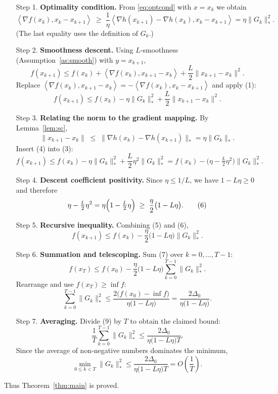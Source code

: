 \documentclass{article}
\newcommand{\inner}[2]{\left\langle #1,#2\right\rangle}
\begin{document}
\begin{enumerate}
\item[Step 1.] \textbf{Optimality condition.}  
From \eqref{eq:optcond} with $x=x_{k}$ we obtain
\[
\inner{\nabla f(x_{k})}{x_{k}-x_{k+1}}
\;\ge\;
\frac{1}{\eta}\inner{\nabla h(x_{k+1})-\nabla h(x_{k})}{x_{k}-x_{k+1}}
= \eta\|G_{k}\|_{*}^{2}.
\tag{1}
\]
(The last equality uses the definition of $G_{k}$.)

\item[Step 2.] \textbf{Smoothness descent.}  
Using $L$‑smoothness (Assumption~\ref{as:smooth}) with $y=x_{k+1}$,
\[
f(x_{k+1})\le f(x_{k})+\inner{\nabla f(x_{k})}{x_{k+1}-x_{k}}
+\frac{L}{2}\|x_{k+1}-x_{k}\|^{2}.
\tag{2}
\]
Replace $\inner{\nabla f(x_{k})}{x_{k+1}-x_{k}}=-\inner{\nabla f(x_{k})}{x_{k}-x_{k+1}}$ and apply (1):
\[
f(x_{k+1})
\le f(x_{k})-\eta\|G_{k}\|_{*}^{2}
+\frac{L}{2}\|x_{k+1}-x_{k}\|^{2}.
\tag{3}
\]

\item[Step 3.] \textbf{Relating the norm to the gradient mapping.}  
By Lemma~\ref{lem:sc},
\[
\|x_{k+1}-x_{k}\|
\;\le\;
\|\nabla h(x_{k})-\nabla h(x_{k+1})\|_{*}
= \eta\|G_{k}\|_{*}.
\tag{4}
\]
Insert (4) into (3):
\[
f(x_{k+1})
\le f(x_{k})-\eta\|G_{k}\|_{*}^{2}
+\frac{L}{2}\eta^{2}\|G_{k}\|_{*}^{2}
= f(x_{k})-\bigl(\eta-\tfrac{L}{2}\eta^{2}\bigr)\|G_{k}\|_{*}^{2}.
\tag{5}
\]

\item[Step 4.] \textbf{Descent coefficient positivity.}  
Since $\eta\le 1/L$, we have $1-L\eta\ge0$ and therefore
\[
\eta-\tfrac{L}{2}\eta^{2}
= \eta\Bigl(1-\tfrac{L}{2}\eta\Bigr)
\;\ge\;
\frac{\eta}{2}\bigl(1-L\eta\bigr).
\tag{6}
\]

\item[Step 5.] \textbf{Recursive inequality.}  
Combining (5) and (6),
\[
f(x_{k+1})
\le f(x_{k})-\frac{\eta}{2}\bigl(1-L\eta\bigr)\|G_{k}\|_{*}^{2}.
\tag{7}
\]

\item[Step 6.] \textbf{Summation and telescoping.}  
Sum (7) over $k=0,\dots,T-1$:
\[
f(x_{T})\le f(x_{0})
-\frac{\eta}{2}\bigl(1-L\eta\bigr)\sum_{k=0}^{T-1}\|G_{k}\|_{*}^{2}.
\tag{8}
\]
Rearrange and use $f(x_{T})\ge\inf f$:
\[
\sum_{k=0}^{T-1}\|G_{k}\|_{*}^{2}
\le
\frac{2\bigl(f(x_{0})-\inf f\bigr)}{\eta\bigl(1-L\eta\bigr)}
=
\frac{2\Delta_{0}}{\eta\bigl(1-L\eta\bigr)}.
\tag{9}
\]

\item[Step 7.] \textbf{Averaging.}  
Divide (9) by $T$ to obtain the claimed bound:
\[
\frac{1}{T}\sum_{k=0}^{T-1}\|G_{k}\|_{*}^{2}
\le
\frac{2\Delta_{0}}{\eta\bigl(1-L\eta\bigr)T}.
\tag{10}
\]
Since the average of non‑negative numbers dominates the minimum,
\[
\min_{0\le k<T}\|G_{k}\|_{*}^{2}
\le
\frac{2\Delta_{0}}{\eta\bigl(1-L\eta\bigr)T}
=O\!\left(\frac{1}{T}\right).
\tag{11}
\]
\end{enumerate}
Thus Theorem~\ref{thm:main} is proved. \hfill\qedsymbol
\end{document}
